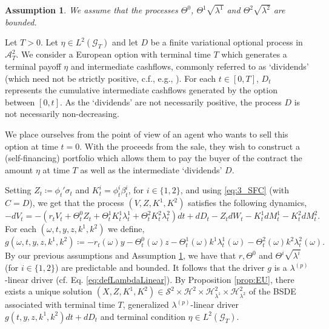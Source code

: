 \documentclass[11pt,a4paper]{article}
\numberwithin{equation}{section}
\theoremstyle{newPlain}
\theoremstyle{newDefinition}
\newtheorem{assumption}{Assumption}[theorem]
\theoremstyle{newRemark}
\begin{document}
\begin{assumption}\label{assumption:LinearCompleteMarket}
    We assume that the processes $\Theta^0$, $\Theta^1\sqrt{\lambda^1}$ and $\Theta^2\sqrt{\lambda^2}$ are bounded.
\end{assumption}



Let $T>0$. Let $\eta\in L^2(\mathcal{G}_T)$ and let $D$ be a finite variational optional process in $\mathcal{A}_T^2$. We consider a European option with terminal time $T$ which generates a terminal payoff $\eta$ and intermediate cashflows, commonly referred to as `dividends' (which need not be strictly positive, c.f., e.g., \cite{crepey2015bilateral}). For each $t\in[0,T]$, $D_t$ represents the cumulative intermediate cashflows generated by the option between $[0,t]$. As the  `dividends' are not necessarily positive, the process $D$ is not necessarily non-decreasing.

We place ourselves from the point of view of an agent who wants to sell this option at time $t=0$. With the proceeds from the sale, they wish to construct a (self-financing)  portfolio which allows them to pay the buyer of the contract the amount $\eta$ at time $T$ as well as the intermediate `dividends' $D$.

Setting $Z_t\coloneqq\phi_t'\sigma_t$ and $K_t^i=\phi_t^i\beta_t^i$, for $i\in\{1,2\}$, and using \eqref{eq:3_SFC} (with $C=D$), we get that the process $(V, Z, K^1, K^2)$ satisfies the following dynamics,
\begin{equation}\label{eq:3_BSDE}
    -dV_t = -(r_tV_t+\Theta_t^0Z_t + \Theta_t^1K_t^1\lambda_t^1+\Theta_t^2K_t^2\lambda_t^2)dt +dD_t - Z_tdW_t - K_t^1dM_t^1 - K_t^2dM_t^2.
\end{equation}
For each $(\omega, t, y, z, k^1, k^2)$ we define,
\begin{equation}\label{eq:3_LinearDriver}
    g(\omega,t,y,z,k^1,k^2) \coloneqq -r_t(\omega)y - \Theta_t^0(\omega)z-\Theta_t^1(\omega)k^1\lambda_t^1(\omega)-\Theta_t^2(\omega)k^2\lambda_t^2(\omega).
\end{equation}
By our previous assumptions  and Assumption \ref{assumption:LinearCompleteMarket}, we have that $r,\Theta^0$ and $\Theta^i\sqrt{\lambda^i}$ (for $i\in\{1,2\}$) are predictable and bounded. It  follows that the driver $g$ is a $\lambda^{(p)}$-linear driver (cf. Eq. \eqref{eq:defLambdaLinear}). By Proposition \ref{prop:EU},  there exists a unique solution $(X,Z,K^1,K^2)\in\mathcal{S}^2\times\mathcal{H}^2\times\mathcal{H}_{\lambda^1}^2\times\mathcal{H}_{\lambda^2}^2$ of the BSDE associated with terminal time $T$, generalized $\lambda^{(p)}$-linear driver $g(t,y,z,k^1,k^2)dt+dD_t$ and terminal condition $\eta\in L^2(\mathcal{G}_T)$.
\end{document}
